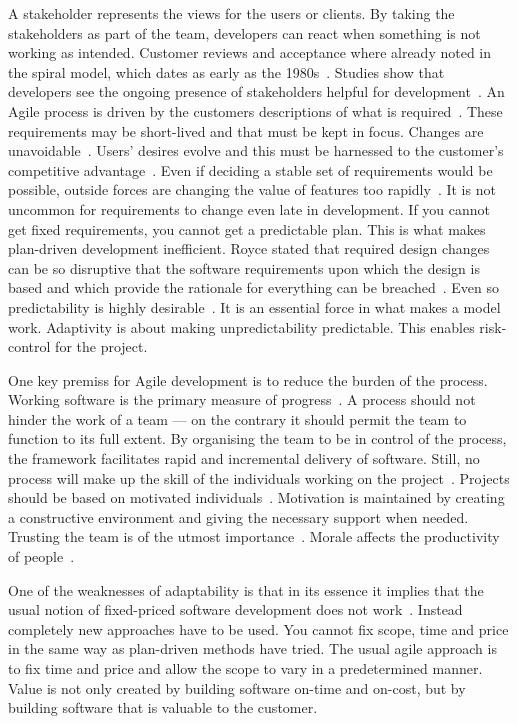 \documentclass[english]{tktltiki2}
\begin{document}
A stakeholder represents the views for the users or clients. By taking the stakeholders as part of the team, developers can react when something is not working as intended. Customer reviews and acceptance where already noted in the spiral model, which dates as early as the 1980s~\cite{Boe88}. Studies show that developers see the ongoing presence of stakeholders helpful for development~\cite{DD08}. An Agile process is driven by the customers descriptions of what is required~\cite{BBB01b}. These requirements may be short-lived and that must be kept in focus. Changes are unavoidable~\cite{Fow05}. Users’ desires evolve and this must be harnessed to the customer’s competitive advantage~\cite{BBB01b, Fow05}. Even if deciding a stable set of requirements would be possible, outside forces are changing the value of features too rapidly~\cite{Fow05}. It is not uncommon for requirements to change even late in development. If you cannot get fixed requirements, you cannot get a predictable plan. This is what makes plan-driven development inefficient. Royce stated that required design changes can be so disruptive that the software requirements upon which the design is based and which provide the rationale for everything can be breached~\cite{Roy70}. Even so predictability is highly desirable~\cite{Fow05}. It is an essential force in what makes a model work. Adaptivity is about making unpredictability predictable. This enables risk-control for the project.

One key premiss for Agile development is to reduce the burden of the process. Working software is the primary measure of progress~\cite{BBB01b}. A process should not hinder the work of a team — on the contrary it should permit the team to function to its full extent. By organising the team to be in control of the process, the framework facilitates rapid and incremental delivery of software. Still, no process will make up the skill of the individuals working on the project~\cite{Boe88, Fow05}. Projects should be based on motivated individuals~\cite{BBB01b}. Motivation is maintained by creating a constructive environment and giving the necessary support when needed. Trusting the team is of the utmost importance~\cite{BBB01b}. Morale affects the productivity of people~\cite{Fow05}.

One of the weaknesses of adaptability is that in its essence it implies that the usual notion of fixed-priced software development does not work~\cite{Fow05}. Instead completely new approaches have to be used. You cannot fix scope, time and price in the same way as plan-driven methods have tried. The usual agile approach is to fix time and price and allow the scope to vary in a predetermined manner. Value is not only created by building software on-time and on-cost, but by building software that is valuable to the customer.
\end{document}
